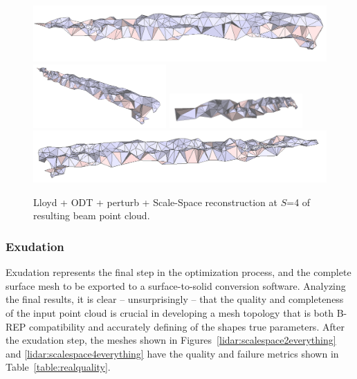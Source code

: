 \documentclass[12pt]{drexelthesis}
\let\Oldsubsubsection\subsubsection
\renewcommand{\subsubsection}{\FloatBarrier\Oldsubsubsection}
\begin{document}
\begin{figure}[!ht]
	\centering
		\includegraphics[width=5in]{real-lab-scans/optimizedNeat/scalespace4perturb00.png}
		\includegraphics[width=2in]{real-lab-scans/optimizedNeat/scalespace4perturb01.png}
		\includegraphics[width=2in]{real-lab-scans/optimizedNeat/scalespace4perturb02.png}
		\includegraphics[width=5in]{real-lab-scans/optimizedNeat/scalespace4perturb03.png}
		\caption[Lloyd + ODT + perturb + Scale-Space reconstruction at $S$=4 of segmented LiDAR data]{\centering Lloyd + ODT + perturb + Scale-Space reconstruction at $S$=4 of resulting beam point cloud.}
	\label{lidar:scalespace4perturb}
\end{figure}

\subsubsection{Exudation}

Exudation represents the final step in the optimization process, and the complete surface mesh to be exported to a surface-to-solid conversion software. Analyzing the final results, it is clear -- unsurprisingly -- that the quality and completeness of the input point cloud is crucial in developing a mesh topology that is both B-REP compatibility and accurately defining of the shapes true parameters. After the exudation step, the meshes shown in Figures~\ref{lidar:scalespace2everything} and \ref{lidar:scalespace4everything} have the quality and failure metrics shown in Table~\ref{table:realquality}.
\end{document}
